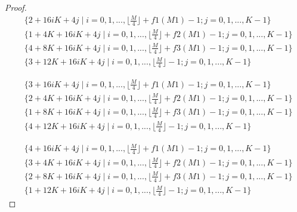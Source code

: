 \documentclass[twoside,a4paper,CCT]{cctart}   %
\begin{document}
\begin{proof}
\begin{equation}\label{3}
\begin{split}
&
\{2+16iK+4j \mid
i=0,1,...,\lfloor \frac{M}{4} \rfloor + f1(M1) -1;
j=0,1,...,K-1\} \\
& \{1+4K+16iK+4j \mid
i=0,1,...,\lfloor \frac{M}{4} \rfloor + f2(M1) -1;
j=0,1,...,K-1\} \\
&
\{4+8K+16iK+4j \mid
i=0,1,...,\lfloor \frac{M}{4} \rfloor + f3(M1) -1;
j=0,1,...,K-1\} \\
&\{3+12K+16iK+4j \mid
i=0,1,...,\lfloor \frac{M}{4} \rfloor -1;
j=0,1,...,K-1\}
\end{split}
\end{equation}

\begin{equation}\label{4}
\begin{split}
&
\{3+16iK+4j \mid
i=0,1,...,\lfloor \frac{M}{4} \rfloor + f1(M1) -1;
j=0,1,...,K-1\} \\
& \{2+4K+16iK+4j \mid
i=0,1,...,\lfloor \frac{M}{4} \rfloor + f2(M1) -1;
j=0,1,...,K-1\} \\
&
\{1+8K+16iK+4j \mid
i=0,1,...,\lfloor \frac{M}{4} \rfloor + f3(M1) -1;
j=0,1,...,K-1\} \\
&\{4+12K+16iK+4j \mid
i=0,1,...,\lfloor \frac{M}{4} \rfloor -1;
j=0,1,...,K-1\}
\end{split}
\end{equation}

\begin{equation}\label{5}
\begin{split}
&
\{4+16iK+4j \mid
i=0,1,...,\lfloor \frac{M}{4} \rfloor + f1(M1) -1;
j=0,1,...,K-1\} \\
& \{3+4K+16iK+4j \mid
i=0,1,...,\lfloor \frac{M}{4} \rfloor + f2(M1) -1;
j=0,1,...,K-1\} \\
&
\{2+8K+16iK+4j \mid
i=0,1,...,\lfloor \frac{M}{4} \rfloor + f3(M1) -1;
j=0,1,...,K-1\} \\
&\{1+12K+16iK+4j \mid
i=0,1,...,\lfloor \frac{M}{4} \rfloor -1;
j=0,1,...,K-1\}
\end{split}
\end{equation}


\end{proof}
\end{document}
